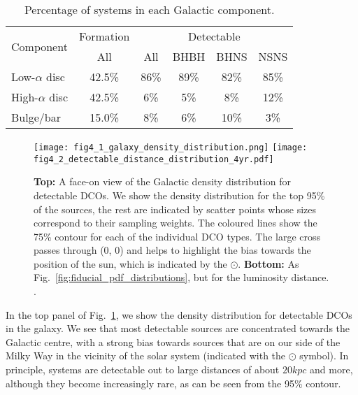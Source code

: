 \begin{table}[tb]
    \centering
    \begin{tabular}{l|c|cccc}
        \hline
        \multirow{2}{*}{Component} & Formation & \multicolumn{4}{c}{Detectable} \\ \cline{2-6}
        & {\scriptsize All} & {\scriptsize All} & {\scriptsize BHBH} & {\scriptsize BHNS} & {\scriptsize NSNS} \\
        \hline
        Low-$\alpha$ disc & 42.5\% & 86\% & 89\% & 82\% & 85\%\\
        High-$\alpha$ disc & 42.5\% & 6\% & 5\% & 8\% & 12\%\\
        Bulge/bar & 15.0\% & 8\% & 6\% & 10\% & 3\%\\
    \end{tabular}
    \caption{Percentage of systems in each Galactic component.}
    \label{tab:component_fractions}
\end{table}
\begin{figure}[tb]
    \centering
    \texttt{[image: fig4\_1\_galaxy\_density\_distribution.png]}
    \texttt{[image: fig4\_2\_detectable\_distance\_distribution\_4yr.pdf]}
    \caption{
    \textbf{Top:} A face-on view of the Galactic density distribution for detectable DCOs. We show the density distribution for the top 95\% of the sources, the rest are indicated by scatter points whose sizes correspond to their sampling weights. The coloured lines show the 75\% contour for each of the individual DCO types. The large cross passes through (0, 0) and helps to highlight the bias towards the position of the sun, which is indicated by the $\odot$.
    \textbf{Bottom:} As Fig.~\ref{fig:fiducial_pdf_distributions}, but for the luminosity distance. \href{https://github.com/TomWagg/detecting-DCOs-in-LISA/blob/main/paper/figures/fig4_1_galaxy_density_distribution.png}{\faFileImage} \href{https://github.com/TomWagg/detecting-DCOs-in-LISA/blob/main/paper/figure_notebooks/galaxy_creation_station.ipynb}{\faBook} \href{https://github.com/TomWagg/detecting-DCOs-in-LISA/blob/main/paper/figures/fig4_2_detectable_distance_distribution_4yr.pdf}{\faFileImage} \href{https://github.com/TomWagg/detecting-DCOs-in-LISA/blob/main/paper/figure_notebooks/fiducial.ipynb}{\faBook}.}
    \label{fig:detectable_distance_dist}
\end{figure}

In the top panel of Fig.~\ref{fig:detectable_distance_dist}, we show the density distribution for detectable DCOs in the galaxy. We see that most detectable sources are concentrated towards the Galactic centre, with a strong bias towards sources that are on our side of the Milky Way in the vicinity of the solar system (indicated with the $\odot$ symbol). In principle, systems are detectable out to large distances of about $20\unit{kpc}$ and more, although they become increasingly rare, as can be seen from the 95\% contour. 

